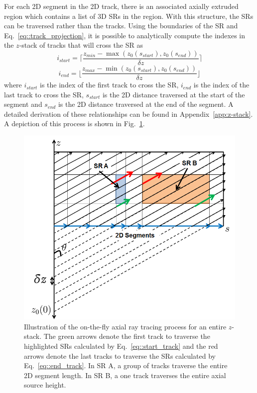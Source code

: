 For each 2D segment in the 2D track, there is an associated axially extruded region which contains a list of 3D \ac{SR}s in the region. With this structure, the \ac{SR}s can be traversed rather than the tracks. Using the boundaries of the \ac{SR} and Eq.~\ref{eq::track_projection}, it is possible to analytically compute the indexes in the $z$-stack of tracks that will cross the \ac{SR} as
\begin{equation}
i_{\textit{start}} = \Bigg\lceil\frac{z_{\textit{min}} - \max\left({z_0(s_{\textit{start}}), z_0(s_{\textit{end}})}\right) }{\delta z}\Bigg\rceil
\label{eq::start_track}
\end{equation}
\begin{equation}
i_{\textit{end}} = \Bigg\lfloor\frac{z_{\textit{max}} - \min\left({z_0(s_{\textit{start}}), z_0(s_{\textit{end}})}\right) }{\delta z}\Bigg\rfloor
\label{eq::end_track}
\end{equation}
where $i_{\textit{start}}$ is the index of the first track to cross the \ac{SR}, $i_{\textit{end}}$ is the index of the last track to cross the \ac{SR}, $s_{\textit{start}}$ is the 2D distance traversed at the start of the segment and $s_{\textit{end}}$ is the 2D distance traversed at the end of the segment. A detailed derivation of these relationships can be found in Appendix~\ref{app:z-stack}. A depiction of this process is shown in Fig.~\ref{fig::stack_tracing}.

\begin{figure}[ht!]
	\centering
	\includegraphics[width=0.75\linewidth]{figures/ph2016/stack_tracing.png}
	\caption{Illustration of the on-the-fly axial ray tracing process for an entire $z$-stack. The green arrows denote the first track to traverse the highlighted \ac{SR}s calculated by Eq.~\ref{eq::start_track} and the red arrows denote the last tracks to traverse the \ac{SR}s calculated by Eq.~\ref{eq::end_track}. In \ac{SR} A, a group of tracks traverse the entire 2D segment length. In \ac{SR} B, a one track traverses the entire axial source height.}
	\label{fig::stack_tracing}
\end{figure}


